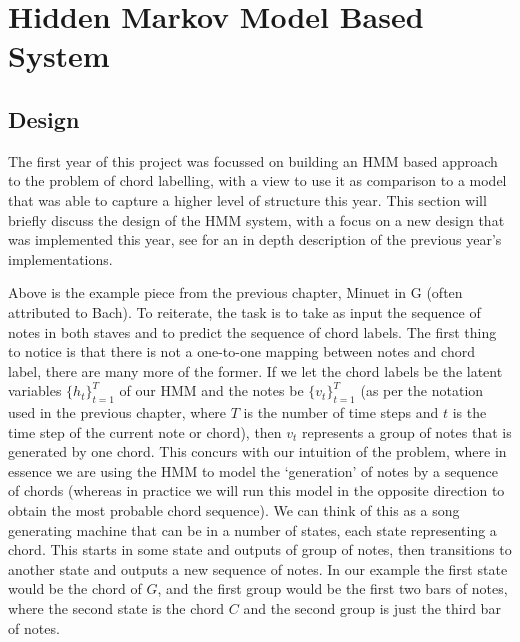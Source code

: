 \documentclass[bsc,singlespacing,logo, parskip, deptreport]{infthesis}
\begin{document}
\section{Hidden Markov Model Based System} \label{HMM}
\subsection{Design} \label{HMM DES}

The first year of this project was focussed on building an HMM based approach to the problem of chord labelling, with a view to use it as comparison to a model that was able to capture a higher level of structure this year. This section will briefly discuss the design of the HMM system, with a focus on a new design that was implemented this year, see \cite{mcafee} for an in depth description of the previous year's implementations.

\begin{center}
  {%
\parindent 0pt
\noindent
\ifx\preLilyPondExample \undefined
\else
  \expandafter\preLilyPondExample
\fi
\def\lilypondbook{}%

\ifx\postLilyPondExample \undefined
\else
  \expandafter\postLilyPondExample
\fi
}
\end{center}

Above is the example piece from the previous chapter, Minuet in G (often attributed to Bach). To reiterate, the task is to take as input the sequence of notes in both staves and to predict the sequence of chord labels. The first thing to notice is that there is not a one-to-one mapping between notes and chord label, there are many more of the former. If we let the chord labels be the latent variables $\{h_t\}_{t=1}^{T}$ of our HMM and the notes be $\{v_t\}_{t=1}^{T}$ (as per the notation used in the previous chapter, where $T$ is the number of time steps and $t$ is the time step of the current note or chord), then $v_t$ represents a group of notes that is generated by one chord. This concurs with our intuition of the problem, where in essence we are using the HMM to model the `generation' of notes by a sequence of chords (whereas in practice we will run this model in the opposite direction to obtain the most probable chord sequence). We can think of this as a song generating machine that can be in a number of states, each state representing a chord. This starts in some state and outputs of group of notes, then transitions to another state and outputs a new sequence of notes. In our example the first state would be the chord of $G$, and the first group would be the first two bars of notes, where the second state is the chord $C$ and the second group is just the third bar of notes.
\end{document}
